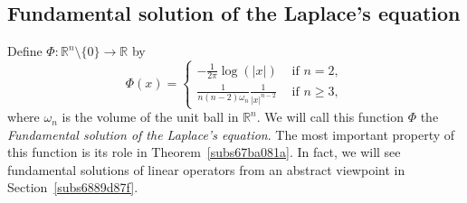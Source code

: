 \documentclass[a4paper,9pt]{amsart}
\newcommand{\R}{\mathbb{R}}	%
\theoremstyle{plain}
\theoremstyle{definition}
\theoremstyle{remark}
\begin{document}
\subsection{Fundamental solution of the Laplace's equation}\label{subs67b9d63e}

Define $\Phi:\R^n\setminus\{0\}\to\R$ by
\begin{equation}\label{eq67b9d6b9}
	\Phi(x) = 
	\begin{cases}
	-\frac{1}{2\pi} \log(|x|) & \text{ if }n=2 , \\
	\frac1{n(n-2)\omega_n } \frac1{|x|^{n-2}} & \text{ if }n\ge 3 ,
	\end{cases}
\end{equation}
where $\omega_n $ is the volume of the unit ball in $\R^n$.
We will call this function $\Phi$ the \emph{Fundamental solution of the Laplace's equation}.
The most important property of this function is its role in Theorem~\ref{subs67ba081a}.
In fact, we will see fundamental solutions of linear operators from an abstract viewpoint in Section~\ref{subs6889d87f}.
\end{document}
